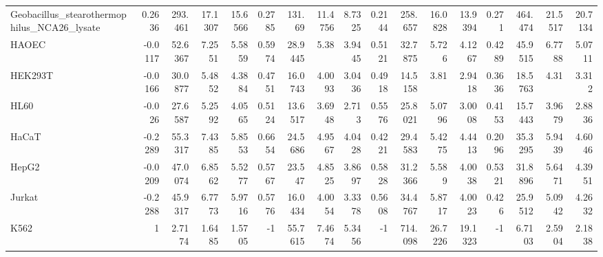\begin{tabular}{lrrrrrrrrrrrrrrrr}
 Geobacillus\_stearothermophilus\_NCA26\_lysate &              0.2636   &         293.461  &          17.1307  &         15.6566  &         0.2785   &    131.69   &     11.4756  &     8.7325  &        0.2144  &  258.657  &   16.0828  &  13.9394  &         0.271    &    464.474  &     21.5517  &     20.7134 \\
 HAOEC                                       &             -0.0117   &          52.6367 &           7.2551  &          5.5859  &         0.5974   &     28.9445 &      5.38    &     3.9445  &        0.5121  &   32.7875 &    5.726   &   4.1267  &         0.4289   &     45.9515 &      6.7788  &      5.0711 \\
 HEK293T                                     &             -0.0166   &          30.0877 &           5.4852  &          4.3884  &         0.4751   &     16.0743 &      4.0093  &     3.0436  &        0.4918  &   14.5158 &    3.81    &   2.9418  &         0.3636   &     18.5763 &      4.31    &      3.312  \\
 HL60                                        &             -0.026    &          27.6587 &           5.2592  &          4.0565  &         0.5124   &     13.6517 &      3.6948  &     2.713   &        0.5576  &   25.8021 &    5.0796  &   3.0008  &         0.4153   &     15.7443 &      3.9679  &      2.8836 \\
 HaCaT                                       &             -0.2289   &          55.3317 &           7.4385  &          5.8553  &         0.6654   &     24.5686 &      4.9567  &     4.0428  &        0.4221  &   29.4583 &    5.4275  &   4.4413  &         0.2096   &     35.3295 &      5.9439  &      4.6046 \\
 HepG2                                       &             -0.0209   &          47.0074 &           6.8562  &          5.5277  &         0.5767   &     23.547  &      4.8525  &     3.8697  &        0.5828  &   31.2366 &    5.589   &   4.0038  &         0.5321   &     31.8896 &      5.6471  &      4.3951 \\
 Jurkat                                      &             -0.2288   &          45.9317 &           6.7773  &          5.9716  &         0.5776   &     16.0434 &      4.0054  &     3.3378  &        0.5608  &   34.4767 &    5.8717  &   4.0023  &         0.426    &     25.9512 &      5.0942  &      4.2632 \\
 K562                                        &              1        &           2.7174 &           1.6485  &          1.5705  &        -1        &     55.7615 &      7.4674  &     5.3456  &       -1       &  714.098  &   26.7226  &  19.1323  &        -1        &      6.7103 &      2.5904  &      2.1838 \\

\end{tabular}
